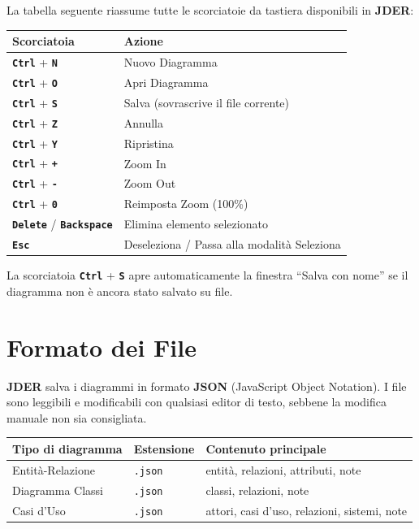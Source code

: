 \documentclass[a4paper,11pt]{article}
\newcommand{\key}[1]{\texttt{\textbf{#1}}}
\newcommand{\jder}{\textbf{JDER}}
\begin{document}
La tabella seguente riassume tutte le scorciatoie da tastiera disponibili in \jder{}:

\begin{center}
\begin{tabular}{@{}ll@{}}
  \toprule
  \textbf{Scorciatoia} & \textbf{Azione} \\
  \midrule
  \key{Ctrl} + \key{N}           & Nuovo Diagramma \\
  \key{Ctrl} + \key{O}           & Apri Diagramma \\
  \key{Ctrl} + \key{S}           & Salva (sovrascrive il file corrente) \\
  \key{Ctrl} + \key{Z}           & Annulla \\
  \key{Ctrl} + \key{Y}           & Ripristina \\
  \key{Ctrl} + \key{+}           & Zoom In \\
  \key{Ctrl} + \key{-}           & Zoom Out \\
  \key{Ctrl} + \key{0}           & Reimposta Zoom (100\%) \\
  \key{Delete} / \key{Backspace} & Elimina elemento selezionato \\
  \key{Esc}                      & Deseleziona / Passa alla modalità Seleziona \\
  \bottomrule
\end{tabular}
\end{center}

\begin{tcolorbox}[notebox, title={Nota}]
  La scorciatoia \key{Ctrl} + \key{S} apre automaticamente la finestra ``Salva con nome''
  se il diagramma non è ancora stato salvato su file.
\end{tcolorbox}

\section{Formato dei File}
\label{sec:files}

\jder{} salva i diagrammi in formato \textbf{JSON} (JavaScript Object Notation). I file sono
leggibili e modificabili con qualsiasi editor di testo, sebbene la modifica manuale non sia
consigliata.

\begin{center}
\begin{tabular}{@{}lll@{}}
  \toprule
  \textbf{Tipo di diagramma} & \textbf{Estensione} & \textbf{Contenuto principale} \\
  \midrule
  Entità-Relazione    & \texttt{.json} & entità, relazioni, attributi, note \\
  Diagramma Classi    & \texttt{.json} & classi, relazioni, note \\
  Casi d'Uso          & \texttt{.json} & attori, casi d'uso, relazioni, sistemi, note \\
  \bottomrule
\end{tabular}
\end{center}
\end{document}
